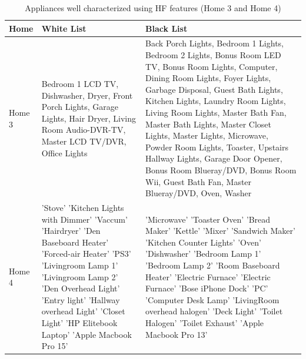 \documentclass[11pt, letterpaper]{article}
\begin{document}
\begin{table}[H]
\caption{Appliances well characterized using HF features (Home 3 and Home 4)}
\begin{center}
\begin{tabular}{|p{2cm}|p{6.0cm}|p{7.0cm}|}\hline
\textbf{Home} & \textbf{White List} & \textbf{Black List}\\
\hline
Home 3 &  
Bedroom 1 LCD TV,
Dishwasher,
Dryer,
Front Porch Lights,
Garage Lights,
Hair Dryer,
Living Room Audio-DVR-TV,
Master LCD TV/DVR,
Office Lights
&
Back Porch Lights, Bedroom 1 Lights, Bedroom 2 Lights, Bonus Room LED TV, Bonus Room Lights, Computer, Dining Room Lights, Foyer Lights, Garbage Disposal, Guest Bath Lights, Kitchen Lights, Laundry Room Lights, Living Room Lights, Master Bath Fan, Master Bath Lights, Master Closet Lights, Master Lights, Microwave, Powder Room Lights, Toaster, Upstairs Hallway Lights,
Garage Door Opener, Bonus Room Blueray/DVD, Bonus Room Wii, Guest Bath Fan, Master Blueray/DVD, Oven, Washer
\\
\hline
Home 4 &
'Stove' 'Kitchen Lights with Dimmer' 'Vaccum' 'Hairdryer' 'Den Baseboard Heater'
'Forced-air Heater' 'PS3' 'Livingroom Lamp 1' 'Livingroom Lamp 2' 'Den Overhead Light' 'Entry light'
'Hallway overhead Light' 'Closet Light'
'HP Elitebook Laptop' 'Apple Macbook Pro 15'
&
'Microwave'
'Toaster Oven'
'Bread Maker'
'Kettle'
'Mixer'
'Sandwich Maker'
'Kitchen Counter Lights'
'Oven'
'Dishwasher'
'Bedroom Lamp 1'
'Bedroom Lamp 2'
'Room Baseboard Heater'
'Electric Furnace'
'Electric Furnace'
'Bose iPhone Dock'
'PC'
'Computer Desk Lamp'
'LivingRoom overhead halogen'
'Deck Light'
'Toilet Halogen'
'Toilet Exhaust'
'Apple Macbook Pro 13'
\\
\hline
\end{tabular}
\end{center}
\label{tab:HFList}
\end{table}

\newpage


\end{document}
